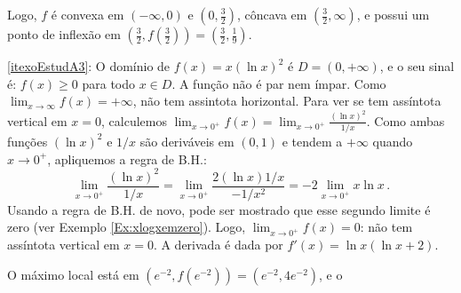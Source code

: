 \begin{exo}
\begin{sol}
\begin{center}
\end{center}
Logo, $f$ é convexa em $(-\infty,0)$ e $(0,\frac32)$,  côncava em
$(\frac32,\infty)$, e possui um ponto de inflexão em 
$(\tfrac{3}{2},f(\tfrac{3}{2}))=(\tfrac{3}{2},\tfrac19)$.
\begin{center}
\begin{bmlimage}\end{bmlimage}
\end{center}
\eqref{itexoEstudA3}:
O domínio de  $f(x)=x(\ln x)^2$ é
$D=(0,+\infty)$, e o seu sinal é: $f(x)\geq 0$ para todo $x\in D$.
A função não é { par} nem { ímpar}.
Como $\lim_{x\to \infty}f(x)=+\infty$, não tem assintota horizontal.
Para ver se tem assíntota vertical em $x=0$, calculemos 
$\lim_{x\to 0^+}f(x)=\lim_{x\to 0^+}\frac{(\ln x)^2}{1/x}$. Como ambas funções
$(\ln x)^2$ e $1/x$ são deriváveis em $(0,1)$ e tendem a $+\infty$ quando $x\to
0^+$, apliquemos a regra de B.H.:
$$
\lim_{x\to 0^+}\frac{(\ln x)^2}{1/x}=
\lim_{x\to 0^+}\frac{2(\ln x)1/x}{-1/x^2}=
-2\lim_{x\to 0^+}x\ln x\,.
$$
Usando a regra de B.H. de novo, pode ser mostrado que esse segundo limite é
zero (ver Exemplo \ref{Ex:xlogxemzero}). Logo, $\lim_{x\to 0^+}f(x)=0$: não
tem assíntota vertical em $x=0$.
A derivada é dada por $f'(x)=\ln x(\ln x+2)$.
\begin{center}
\begin{bmlimage}\end{bmlimage}
\end{center}
O máximo local está em
$(e^{-2},f(e^{-2}))=(e^{-2},4e^{- 2})$, e o

\end{sol}
\end{exo}
